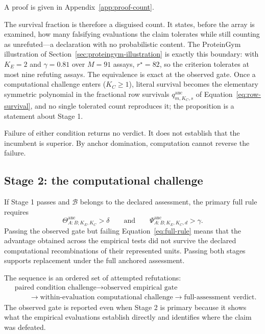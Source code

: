 \documentclass[11pt]{article}
\newcommand{\Boot}{\mathcal{B}}
\newcommand{\Psianc}{\Psi^{\mathrm{anc}}}
\newcommand{\Thetaanc}{\Theta^{\mathrm{anc}}}
\theoremstyle{remark}
\begin{document}
A proof is given in Appendix~\ref{app:proof-count}.

The survival fraction is therefore a disguised count. It states, before the
array is examined, how many falsifying evaluations the claim tolerates while
still counting as unrefuted---a declaration with no probabilistic content. The
ProteinGym illustration of Section~\ref{sec:proteingym-illustration} is exactly
this boundary: with $K_E=2$ and $\gamma=0.81$ over $M=91$ assays, $r^\star=82$,
so the criterion tolerates at most nine refuting assays. The equivalence is
exact at the observed gate. Once a computational challenge enters ($K_C\geq1$),
literal survival becomes the elementary symmetric polynomial in the fractional
row survivals $q^{\mathrm{anc}}_{m,K_C,s}$ of Equation~\eqref{eq:row-survival},
and no single tolerated count reproduces it; the proposition is a statement
about Stage 1.

Failure of either condition returns no verdict. It does not establish that the
incumbent is superior. By anchor domination, computation cannot reverse the
failure.

\subsection{Stage 2: the computational challenge}

If Stage 1 passes and $\Boot$ belongs to the declared assessment, the primary
full rule requires
\begin{equation}
\Thetaanc_{A:B;K_E,K_C}>\delta
\qquad\text{and}\qquad
\Psianc_{A:B;K_E,K_C,d}>\gamma.
\label{eq:full-rule}
\end{equation}
Passing the observed gate but failing Equation~\eqref{eq:full-rule} means that
the advantage obtained across the empirical tests did not survive the declared
computational recombinations of their represented units. Passing both stages
supports replacement under the full anchored assessment.

The sequence is an ordered set of attempted refutations:
\[
\begin{aligned}
&\text{paired condition challenge}
\longrightarrow
\text{observed empirical gate}\\
&\qquad\longrightarrow
\text{within-evaluation computational challenge}
\longrightarrow
\text{full-assessment verdict}.
\end{aligned}
\]
The observed gate is reported even when Stage 2 is primary because it shows
what the empirical evaluations establish directly and identifies where the
claim was defeated.
\end{document}
